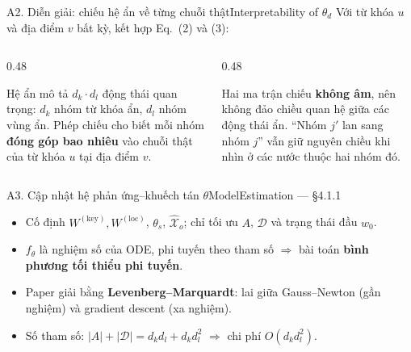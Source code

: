 \begin{frame}{A2. Diễn giải: chiếu hệ ẩn về từng chuỗi thật}{Interpretability of $\theta_d$}
\small Với từ khóa $u$ và địa điểm $v$ bất kỳ, kết hợp Eq.~(2) và (3):
\vspace{2mm}
\begin{columns}[T,onlytextwidth]
\begin{column}{0.48\textwidth}
\begin{intuition}[Ý nghĩa]
  Hệ ẩn mô tả $d_k\cdot d_l$ động thái quan trọng: $d_k$ nhóm từ khóa ẩn, $d_l$ nhóm vùng ẩn.
  Phép chiếu cho biết mỗi nhóm \textbf{đóng góp bao nhiêu} vào chuỗi thật của từ khóa $u$ tại địa điểm $v$.
\end{intuition}
\end{column}
\begin{column}{0.48\textwidth}
\begin{takeaway}
  Hai ma trận chiếu \textbf{không âm}, nên không đảo chiều quan hệ giữa các động thái ẩn.
  ``Nhóm $j'$ lan sang nhóm $j$'' vẫn giữ nguyên chiều khi nhìn ở các nước thuộc hai nhóm đó.
\end{takeaway}
\end{column}
\end{columns}
\vfill
{}
\end{frame}

\begin{frame}{A3. Cập nhật hệ phản ứng--khuếch tán $\theta$}{ModelEstimation --- §4.1.1}
\vspace{3mm}
\begin{itemize}\small
  \item Cố định $W^{(\mathrm{key})},W^{(\mathrm{loc})}$, $\theta_s$, $\widehat{\mathcal X}_o$; chỉ tối ưu $A$, $\mathcal D$ và trạng thái đầu $w_0$.
  \item $f_\theta$ là nghiệm số của ODE, phi tuyến theo tham số $\Rightarrow$ bài toán \textbf{bình phương tối thiểu phi tuyến}.
  \item Paper giải bằng \textbf{Levenberg--Marquardt}: lai giữa Gauss--Newton (gần nghiệm) và gradient descent (xa nghiệm).
  \item Số tham số: $|A|+|\mathcal D| = d_k d_l + d_k d_l^2$ $\Rightarrow$ chi phí $O(d_k d_l^2)$.
\end{itemize}
\vfill
{}
\end{frame}

